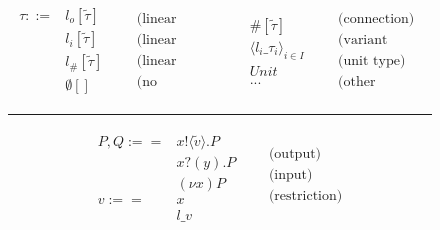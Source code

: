 \begin{figure}[h]
    \centering
    \begin{align*}
        \begin{split}
            \tau ::= & l_o[\widetilde{\tau}] \\
            & l_i[\widetilde{\tau}] \\
            & l_\#[\widetilde{\tau}] \\
            & \emptyset[]
        \end{split}
        &
        \begin{split}
            & \text{(linear output)} \\
            & \text{(linear input)} \\
            & \text{(linear connection)} \\
            & \text{(no capability)}
        \end{split}
        & 
        \begin{split}
            & \#[\widetilde{\tau}]\\
            & \langle l_i\_\tau_i\rangle_{i \in I}\\
            & Unit \\
            & ...
        \end{split}
        &
        \begin{split}
            & \text{(connection)} \\
            & \text{(variant type)} \\
            & \text{(unit type)} \\
            & \text{(other constructs)}
        \end{split}
    \end{align*}
    \noindent\rule{12cm}{0.8pt}
    \begin{align*}
        \begin{split}
            P, Q :== & x!\langle \widetilde{v} \rangle.P \\
            & x?(y).P\\
            & (\nu x) P \\[10pt]
            v :== & x \\
            & l\_v
        \end{split}
        &
        \begin{split}
            &\text{(output)} \\
            &\text{(input)} \\
            &\text{(restriction)} \\[10pt]

\end{split}
\end{align*}
\end{figure}
